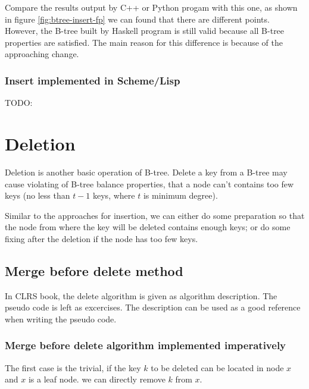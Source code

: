 \documentclass{article}
\begin{document}
Compare the results output by C++ or Python progam with this one,
as shown in figure \ref{fig:btree-insert-fp}
we can found that there are different points. However, the B-tree
built by Haskell program is still valid because all B-tree properties
are satisfied. The main reason for this difference is because of
the approaching change.

\subsubsection*{Insert implemented in Scheme/Lisp}
TODO:


\section{Deletion} 

Deletion is another basic operation of B-tree. Delete a key from a
B-tree may cause violating of B-tree balance properties, that a node
can't contains too few keys (no less than $t-1$ keys, where $t$ is 
minimum degree).

Similar to the approaches for insertion, we can either do some preparation
so that the node from where the key will be deleted contains enough
keys; or do some fixing after the deletion if the node has too few keys.


\subsection{Merge before delete method} 

In CLRS book, the delete algorithm is given as algorithm description.
The pseudo code is left as excercises. The description can be used
as a good reference when writing the pseudo code.

\subsubsection{Merge before delete algorithm implemented imperatively}

The first case is the trivial, if the key $k$ to be deleted
can be located in node $x$ and $x$ is a leaf node. we can directly
remove $k$ from $x$.
\end{document}
